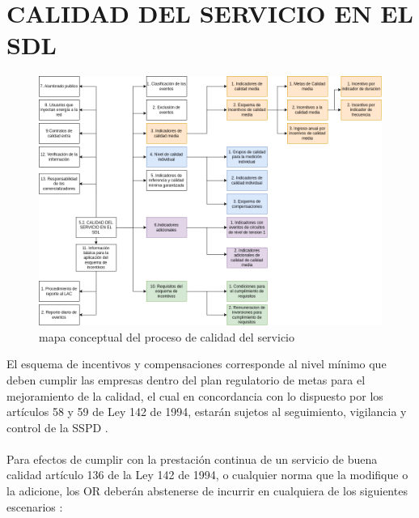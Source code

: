 \documentclass[a5paper]{book}%
\begin{document}
    \section{CALIDAD DEL SERVICIO EN EL SDL}

    \begin{figure}[H]
  \centering
  \caption{mapa conceptual del proceso de calidad del servicio}
  \label{fig:esquema}
  \includegraphics[width=\linewidth]{mapa_calidad_sdl}
\end{figure}

    El esquema de incentivos y compensaciones corresponde al nivel mínimo que deben cumplir las empresas dentro del plan regulatorio de metas para el mejoramiento de la calidad, el cual en concordancia con lo dispuesto por los artículos 58 y 59 de Ley 142 de 1994, estarán sujetos al seguimiento, vigilancia y control de la SSPD \cite{CREG0152018}.\\\\
    Para efectos de cumplir con la prestación continua de un servicio de buena calidad artículo 136 de la Ley 142 de 1994, o cualquier norma que la modifique o la adicione, los OR deberán abstenerse de incurrir en cualquiera de los siguientes escenarios \cite{CREG0152018}:
\end{document}
